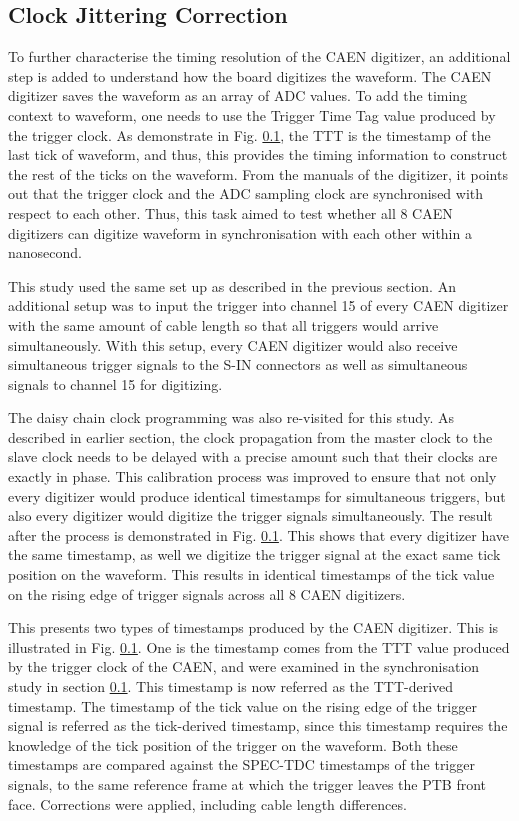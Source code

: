 \subsection{Clock Jittering Correction}

To further characterise the timing resolution of the CAEN digitizer, an additional step is added to understand how the board digitizes the waveform.
The CAEN digitizer saves the waveform as an array of ADC values.
To add the timing context to waveform, one needs to use the Trigger Time Tag value produced by the trigger clock.
As demonstrate in Fig. \ref{}, the TTT is the timestamp of the last tick of waveform, and thus, this provides the timing information to construct the rest of the ticks on the waveform.
From the manuals of the digitizer, it points out that the trigger clock and the ADC sampling clock are synchronised with respect to each other.
Thus, this task aimed to test whether all 8 CAEN digitizers can digitize waveform in synchronisation with each other within a nanosecond. 

This study used the same set up as described in the previous section.
An additional setup was to input the trigger into channel 15 of every CAEN digitizer with the same amount of cable length so that all triggers would arrive simultaneously.
With this setup, every CAEN digitizer would also receive simultaneous trigger signals to the S-IN connectors as well as simultaneous signals to channel 15 for digitizing.

The daisy chain clock programming was also re-visited for this study.
As described in earlier section, the clock propagation from the master clock to the slave clock needs to be delayed with a precise amount such that their clocks are exactly in phase.
This calibration process was improved to ensure that not only every digitizer would produce identical timestamps for simultaneous triggers, but also every digitizer would digitize the trigger signals simultaneously.
The result after the process is demonstrated in Fig. \ref{}.
This shows that every digitizer have the same timestamp, as well we digitize the trigger signal at the exact same tick position on the waveform.
This results in identical timestamps of the tick value on the rising edge of trigger signals across all 8 CAEN digitizers.

This presents two types of timestamps produced by the CAEN digitizer.
This is illustrated in Fig. \ref {}.
One is the timestamp comes from the TTT value produced by the trigger clock of the CAEN, and were examined in the synchronisation study in section \ref {}.
This timestamp is now referred as the TTT-derived timestamp.
The timestamp of the tick value on the rising edge of the trigger signal is referred as the tick-derived timestamp, since this timestamp requires the knowledge of the tick position of the trigger on the waveform.
Both these timestamps are compared against the SPEC-TDC timestamps of the trigger signals, to the same reference frame at which the trigger leaves the PTB front face.
Corrections were applied, including cable length differences.

